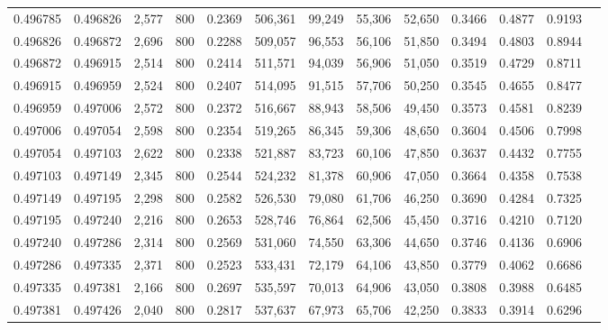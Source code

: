 \begin{tabular}{rrrrrrrrrrrrr}
0.496785 & 0.496826 &  2,577 &   800 &                                     0.2369 & 506,361 &  99,249 &  55,306 &  52,650 & 0.3466 & 0.4877 & 0.9193 \\
0.496826 & 0.496872 &  2,696 &   800 &                                     0.2288 & 509,057 &  96,553 &  56,106 &  51,850 & 0.3494 & 0.4803 & 0.8944 \\
0.496872 & 0.496915 &  2,514 &   800 &                                     0.2414 & 511,571 &  94,039 &  56,906 &  51,050 & 0.3519 & 0.4729 & 0.8711 \\
0.496915 & 0.496959 &  2,524 &   800 &                                     0.2407 & 514,095 &  91,515 &  57,706 &  50,250 & 0.3545 & 0.4655 & 0.8477 \\
0.496959 & 0.497006 &  2,572 &   800 &                                     0.2372 & 516,667 &  88,943 &  58,506 &  49,450 & 0.3573 & 0.4581 & 0.8239 \\
0.497006 & 0.497054 &  2,598 &   800 &                                     0.2354 & 519,265 &  86,345 &  59,306 &  48,650 & 0.3604 & 0.4506 & 0.7998 \\
0.497054 & 0.497103 &  2,622 &   800 &                                     0.2338 & 521,887 &  83,723 &  60,106 &  47,850 & 0.3637 & 0.4432 & 0.7755 \\
0.497103 & 0.497149 &  2,345 &   800 &                                     0.2544 & 524,232 &  81,378 &  60,906 &  47,050 & 0.3664 & 0.4358 & 0.7538 \\
0.497149 & 0.497195 &  2,298 &   800 &                                     0.2582 & 526,530 &  79,080 &  61,706 &  46,250 & 0.3690 & 0.4284 & 0.7325 \\
0.497195 & 0.497240 &  2,216 &   800 &                                     0.2653 & 528,746 &  76,864 &  62,506 &  45,450 & 0.3716 & 0.4210 & 0.7120 \\
0.497240 & 0.497286 &  2,314 &   800 &                                     0.2569 & 531,060 &  74,550 &  63,306 &  44,650 & 0.3746 & 0.4136 & 0.6906 \\
0.497286 & 0.497335 &  2,371 &   800 &                                     0.2523 & 533,431 &  72,179 &  64,106 &  43,850 & 0.3779 & 0.4062 & 0.6686 \\
0.497335 & 0.497381 &  2,166 &   800 &                                     0.2697 & 535,597 &  70,013 &  64,906 &  43,050 & 0.3808 & 0.3988 & 0.6485 \\
0.497381 & 0.497426 &  2,040 &   800 &                                     0.2817 & 537,637 &  67,973 &  65,706 &  42,250 & 0.3833 & 0.3914 & 0.6296 \\

\end{tabular}
